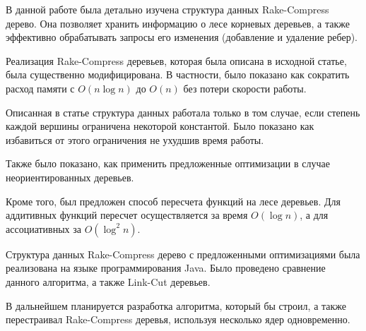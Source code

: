 \startconclusionpage

В данной работе была детально изучена структура данных Rake-Compress дерево. 
Она позволяет хранить информацию о лесе корневых деревьев, а также эффективно обрабатывать запросы его изменения (добавление и удаление ребер).

Реализация Rake-Compress деревьев, которая была описана в исходной статье, была существенно модифицирована. 
В частности, было показано как сократить расход памяти с $O(n \log n)$ до $O(n)$ без потери скорости работы.

Описанная в статье структура данных работала только в том случае, если степень каждой вершины ограничена некоторой константой. 
Было показано как избавиться от этого ограничения не ухудшив время работы.

Также было показано, как применить предложенные оптимизации в случае неориентированных деревьев. 

Кроме того, был предложен способ пересчета функций на лесе деревьев. 
Для аддитивных функций пересчет осуществляется за время $O(\log n)$, а для ассоциативных за $O(\log^2 n)$.

Структура данных Rake-Compress дерево с предложенными оптимизациями была реализована на языке программирования Java. 
Было проведено сравнение данного алгоритма, а также Link-Cut деревьев.

В дальнейшем планируется разработка алгоритма, который бы строил, а также перестраивал Rake-Compress деревья, используя несколько ядер одновременно.

\FloatBarrier
